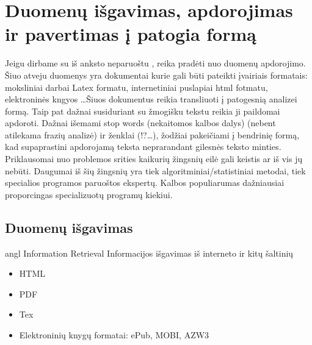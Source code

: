\documentclass{VUMIFInfKursinis}
\begin{document}
\section{Duomenų išgavimas, apdorojimas ir pavertimas į patogia formą}
	Jeigu dirbame su iš anksto neparuoštu , reika pradėti nuo duomenų apdorojimo\cite{kadhim2014text}. Šiuo atveju duomenys yra dokumentai kurie gali būti pateikti įvairiais formatais: moksliniai darbai Latex formatu, internetiniai puslapiai html fotmatu, elektroninės kngyos \ldots Šiuos dokumentus reikia transliuoti į patogesnią analizei formą. Taip pat dažnai susiduriant su žmogišku tekstu reikia ji paildomai apdoroti. Dažnai išemami stop words (nekaitomos kalbos dalys) (nebent atilekama frazių analizė) ir ženklai (!?\ldots), žodžiai pakeičiami į bendrinię formą, kad supaprastini apdorojamą teksta neprarandant gilesnės teksto minties. 
	Priklausomai nuo problemos srities kaikurių žingsnių eilė gali keistis ar iš vis jų nebūti. 
	Daugumai iš šių žingsnių yra tiek algoritminiai/statistiniai metodai, tiek specialios programos paruoštos ekspertų. Kalbos populiarumas dažniausiai proporcingas specializuotų programų kiekiui.

	\subsection{Duomenų išgavimas}
		angl Information Retrieval
		Informacijos išgavimas iš interneto ir kitų šaltinių
		\begin{itemize}
			\item HTML
			\item PDF
			\item Tex
			\item Elektroninių knygų formatai: ePub, MOBI, AZW3
		\end{itemize}
\end{document}
